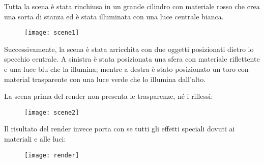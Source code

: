Tutta la scena è stata rinchiusa in un grande cilindro con materiale rosso che crea una sorta di stanza ed è stata illuminata con una luce centrale bianca.

 \begin{figure}[htb]
    \centering
    \texttt{[image: scene1]}
    \caption{\label{fig:scene1}}
\end{figure}

Successivamente, la scena è stata arricchita con due oggetti posizionati dietro lo specchio centrale. A sinistra è stata posizionata una sfera con materiale riflettente e una luce blu che la illumina; mentre a destra è stato posizionato un toro con material trasparente con una luce verde che lo illumina dall'alto.
\newpage

La scena prima del render non presenta le trasparenze, né i riflessi:
 \begin{figure}[htb]
    \centering
    \texttt{[image: scene2]}
    \caption{\label{fig:scene2}}
    \vspace{-0.3cm}
\end{figure}

Il risultato del render invece porta con se tutti gli effetti speciali dovuti ai materiali e alle luci:
 \begin{figure}[htb]
    \centering
    \texttt{[image: render]}
    \caption{\label{fig:render}}
    \vspace{-0.7cm}
\end{figure}


























%

